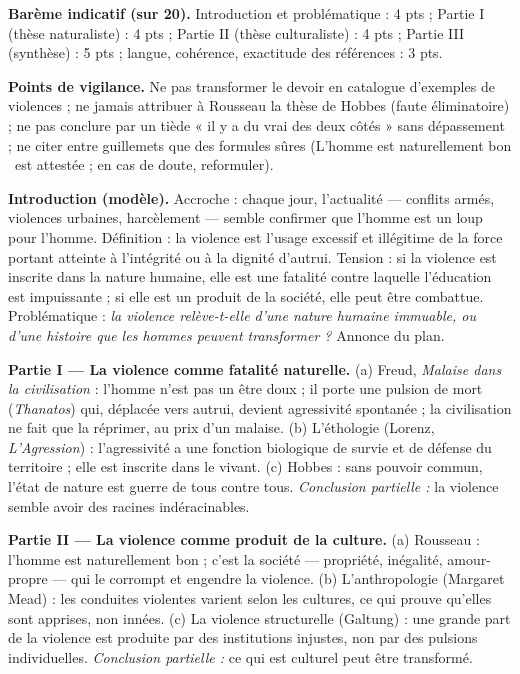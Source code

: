 \documentclass[11pt]{article}
\begin{document}
\begin{corrige}

\textbf{Barème indicatif (sur 20).} Introduction et problématique : 4 pts ; Partie I (thèse naturaliste) : 4 pts ; Partie II (thèse culturaliste) : 4 pts ; Partie III (synthèse) : 5 pts ; langue, cohérence, exactitude des références : 3 pts.

\textbf{Points de vigilance.} Ne pas transformer le devoir en catalogue d'exemples de violences ; ne jamais attribuer à Rousseau la thèse de Hobbes (faute éliminatoire) ; ne pas conclure par un tiède « il y a du vrai des deux côtés » sans dépassement ; ne citer entre guillemets que des formules sûres (\guillemotleft L'homme est naturellement bon \guillemotright\ est attestée ; en cas de doute, reformuler).

\textbf{Introduction (modèle).} Accroche : chaque jour, l'actualité — conflits armés, violences urbaines, harcèlement — semble confirmer que l'homme est un loup pour l'homme. Définition : la violence est l'usage excessif et illégitime de la force portant atteinte à l'intégrité ou à la dignité d'autrui. Tension : si la violence est inscrite dans la nature humaine, elle est une fatalité contre laquelle l'éducation est impuissante ; si elle est un produit de la société, elle peut être combattue. Problématique : \emph{la violence relève-t-elle d'une nature humaine immuable, ou d'une histoire que les hommes peuvent transformer ?} Annonce du plan.

\textbf{Partie I — La violence comme fatalité naturelle.} (a) Freud, \emph{Malaise dans la civilisation} : l'homme n'est pas un être doux ; il porte une pulsion de mort (\emph{Thanatos}) qui, déplacée vers autrui, devient agressivité spontanée ; la civilisation ne fait que la réprimer, au prix d'un malaise. (b) L'éthologie (Lorenz, \emph{L'Agression}) : l'agressivité a une fonction biologique de survie et de défense du territoire ; elle est inscrite dans le vivant. (c) Hobbes : sans pouvoir commun, l'état de nature est guerre de tous contre tous. \emph{Conclusion partielle :} la violence semble avoir des racines indéracinables.

\textbf{Partie II — La violence comme produit de la culture.} (a) Rousseau : l'homme est naturellement bon ; c'est la société — propriété, inégalité, amour-propre — qui le corrompt et engendre la violence. (b) L'anthropologie (Margaret Mead) : les conduites violentes varient selon les cultures, ce qui prouve qu'elles sont apprises, non innées. (c) La violence structurelle (Galtung) : une grande part de la violence est produite par des institutions injustes, non par des pulsions individuelles. \emph{Conclusion partielle :} ce qui est culturel peut être transformé.


\end{corrige}
\end{document}
